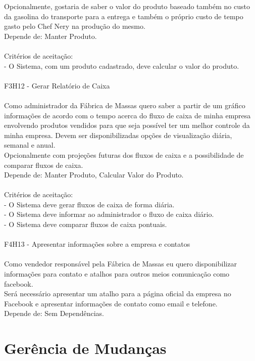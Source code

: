 \tab Opcionalmente, gostaria de saber o valor do produto baseado também no custo da gasolina do transporte para a entrega e também o próprio custo de tempo gasto pelo Chef Nery na produção do mesmo.\\
\tab Depende de: Manter Produto.\\
\\
\tab Critérios de aceitação:\\
\tab - O Sistema, com um produto cadastrado, deve calcular o valor do produto.\\
\\
\tab F3H12 - Gerar Relatório de Caixa\\
\\
\tab Como administrador da Fábrica de Massas quero saber a partir de um gráfico informações de acordo com o tempo acerca do fluxo de caixa de minha empresa envolvendo produtos vendidos para que seja possível ter um melhor controle da minha empresa. Devem ser disponibilizadas opções de visualização diária, semanal e anual.\\
\tab Opcionalmente com projeções futuras dos fluxos de caixa e a possibilidade de comparar fluxos de caixa.\\
\tab Depende de: Manter Produto, Calcular Valor do Produto.\\
\\
\tab Critérios de aceitação:\\
\tab - O Sistema deve gerar fluxos de caixa de forma diária.\\
\tab - O Sistema deve informar ao administrador o fluxo de caixa diário.\\
\tab - O Sistema deve comparar fluxos de caixa pontuais.\\
\\
\tab F4H13 - Apresentar informações sobre a empresa e contatos\\
\\
\tab Como vendedor responsável pela Fábrica de Massas eu quero disponibilizar informações para contato e atalhos para outros meios comunicação como facebook.\\
\tab Será necessário apresentar um atalho para a página oficial da empresa no Facebook e apresentar informações de contato como email e telefone.\\
\tab Depende de: Sem Dependências.\\

\section{Gerência de Mudanças}

